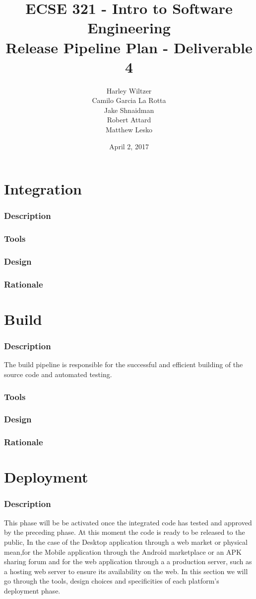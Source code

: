\documentclass[12pt]{report}
\title{ECSE 321 - Intro to Software Engineering\\Release Pipeline Plan - Deliverable 4}
\author{Harley Wiltzer\\Camilo Garcia La Rotta\\Jake Shnaidman\\Robert Attard\\Matthew Lesko}
\date{April 2, 2017}
\begin{document}
\maketitle
\newpage
{} %
\tableofcontents
\part{Integration}
\section{Description}
\section{Tools}
\section{Design}
\section{Rationale}
\part{Build}
\section{Description}
The build pipeline is responsible for the successful and efficient building of the source code and
automated testing.
\section{Tools}
\section{Design}
\section{Rationale}
\part{Deployment}
\section{Description}
This phase will be be activated once the integrated code has tested and approved by the preceding phase. At this moment the code is ready to be released to the public, In the case of the Desktop application through a web market or physical mean,for the Mobile application through the Android marketplace or an APK sharing forum and for the web application through a a production server, such as a hosting web server to ensure its availability on the web. In this section we will go through the tools, design choices and specificities of each platform's deployment phase.
\end{document}
